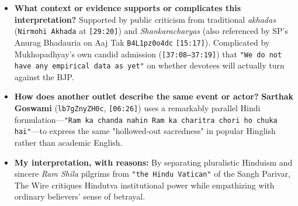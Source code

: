 \documentclass[10pt,a4paper]{article}
\begin{document}
\begin{itemize}[leftmargin=1.5em, itemsep=3pt, topsep=4pt]
  \item \textbf{What context or evidence supports or complicates this interpretation?} Supported by public criticism from traditional \textit{akhadas} (\texttt{Nirmohi Akhada} at \texttt{[29:20]}) and \textit{Shankaracharyas} (also referenced by SP's Anurag Bhadauria on Aaj Tak \texttt{B4L1pz0o4dc} \texttt{[15:17]}). Complicated by Mukhopadhyay's own candid admission (\texttt{[37:08--37:19]}) that \texttt{"We do not have any empirical data as yet"} on whether devotees will actually turn against the BJP.
  \item \textbf{How does another outlet describe the same event or actor?} \textbf{Sarthak Goswami} (\texttt{lb7gZnyZH0c}, \texttt{[06:26]}) uses a remarkably parallel Hindi formulation---\texttt{"Ram ka chanda nahin Ram ka charitra chori ho chuka hai"}---to express the same "hollowed-out sacredness" in popular Hinglish rather than academic English.
  \item \textbf{My interpretation, with reasons:} By separating pluralistic Hinduism and sincere \textit{Ram Shila} pilgrims from \texttt{"the Hindu Vatican"} of the Sangh Parivar, The Wire critiques Hindutva institutional power while empathizing with ordinary believers' sense of betrayal.
\end{itemize}
\end{document}
